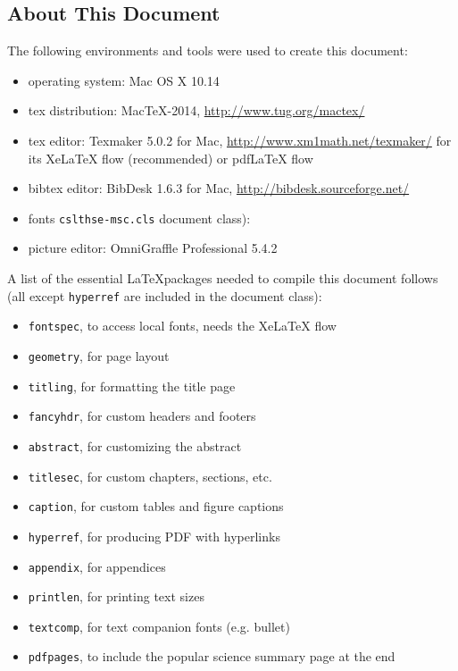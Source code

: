 \documentclass[nofilelist]{cslthse-msc}
\begin{document}
\begin{appendices}
\chapter{About This Document}
The following environments and tools were used to create this document:
\begin{itemize}
\item operating system: Mac OS X 10.14
\item tex distribution: MacTeX-2014, \url{http://www.tug.org/mactex/}
\item tex editor: Texmaker 5.0.2 for Mac, \url{http://www.xm1math.net/texmaker/} for its XeLaTeX flow (recommended) or pdfLaTeX flow
\item bibtex editor: BibDesk 1.6.3 for Mac, \url{http://bibdesk.sourceforge.net/}
\item fonts \texttt{cslthse-msc.cls} document class): 
\item picture editor: OmniGraffle Professional 5.4.2
\end{itemize}

\noindent A list of the essential \LaTeX packages needed to compile this document follows (all except \texttt{hyperref} are included in the document class):
\begin{itemize}
\item \texttt{fontspec}, to access local fonts, needs the XeLaTeX flow
\item \texttt{geometry}, for page layout
\item \texttt{titling}, for formatting the title page
\item \texttt{fancyhdr}, for custom headers and footers
\item \texttt{abstract}, for customizing the abstract
\item \texttt{titlesec}, for custom chapters, sections, etc.
\item \texttt{caption}, for custom tables and figure captions
\item \texttt{hyperref}, for producing PDF with hyperlinks
\item \texttt{appendix}, for appendices
\item \texttt{printlen}, for printing text sizes
\item \texttt{textcomp}, for text companion fonts (e.g. bullet)
\item \texttt{pdfpages}, to include the popular science summary page at the end
\end{itemize}


\end{appendices}
\end{document}
